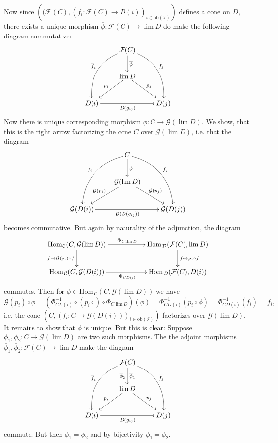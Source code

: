 \documentclass[11pt]{book}
\numberwithin{dummy}{section}
\theoremstyle{nonumberbreak}
\newenvironment{sol}[1][]{\ifthenelse{\equal{#1}{}}{\solution}{\solution[#1]}\rm}{\endsolution}
\newenvironment{prob}[1][]{\ifthenelse{\equal{#1}{}}{\problem}{\problem[#1]}\rm}{\endproblem}
\newcommand{\Hom}{\mathrm{Hom}\hspace{1pt}}
\newcommand{\C}{\mathcal{C}}
\newcommand{\D}{\mathcal{D}}
\newcommand{\F}{\mathcal{F}}
\newcommand{\G}{\mathcal{G}}
\newcommand{\I}{\mathcal{I}}
\newcommand{\la}{\longrightarrow}
\begin{document}
\begin{spacing}{1.4}
\begin{prob}
\begin{sol}
\begin{compactenum}
\item Now since $\left( (\F(C),(\overline{f}_i: \F(C) \la D(i))_{i \in \mathrm{ob}(\I)}\right)$ defines a cone on $D$, there exists a unique morphism $\overline{\phi}: \F(C) \la \lim D$ do make the following diagram commutative:
$$
\begin{xy}
\xymatrix{
& \F(C) \ar@/^{20pt}/[rdd]^{\overline{f_j}} \ar@/_{20pt}/[ldd]_{\overline{f}_i} \ar[d]^{\overline{\phi}} & \\ & \lim D \ar[rd]^{p_j} \ar[ld]_{p_i} & \\ D(i) \ar[rr]_{D(g_{ij})} && D(j) 
}
\end{xy}
$$
Now there is unique corresponding morphism $\phi: C \la \G( \lim D)$. We show, that this is the right arrow factorizing the cone $C$ over $\G(\lim D)$, i.e. that the diagram
$$
\begin{xy}
\xymatrix{
& C \ar[d]^{\phi} \ar@/^{20pt}/[rdd]^{f_j} \ar@/_{20pt}/[ldd]_{f_i} & \\ &  \G(\lim D) \ar[rd]^{\G(p_j)} \ar[ld]_{\G(p_i)} & \\ \G(D(i)) \ar[rr]_{\G(D(g_{ij}))} && \G(D(j))
}
\end{xy}
$$
becomes commutative. But again by naturality of the adjunction, the diagram
$$
\begin{xy}
\xymatrix{
\Hom_{\C}(C, \G(\lim D)) \ar[rr]^{\Phi_{C\lim D}} \ar[d]_{f \mapsto \G(p_i) \circ f} && \Hom_{\D}(\F(C), \lim D) \ar[d]^{f \mapsto p_i \circ f} \\ \Hom_{\C}(C, \G(D(i))) \ar[rr]_{\Phi_{CD(i)}} && \Hom_{\D}(\F(C), D(i))
}
\end{xy}
$$
commutes. Then for $\phi \in \Hom_{\C}(C, \G(\lim D))$ we have 
$$\G(p_i) \circ \phi = \left( \Phi_{CD(i)}^{-1} \circ (p_i \circ ) \circ \Phi_{C \lim D} \right) (\phi) = \Phi_{CD(i)}^{-1}(p_i \circ \overline{\phi}) = \Phi_{CD(i)}^{-1}(\overline{f}_i) = f_i,$$
i.e. the cone $\left(C, (f_i:C \la \G(D(i)))_{i \in \mathrm{ob}(\I)}\right)$ factorizes over $\G (\lim D)$. It remains to show that $\phi$ is unique. But this is clear: Suppose $\phi_1, \phi_2: C \la \G (\lim D)$ are two such morphisms. The the adjoint morphisms $\overline{\phi}_1, \overline{\phi}_2: \F(C) \la \lim D$ make the diagram
$$
\begin{xy}
\xymatrix{
& \F(C) \ar@/^{20pt}/[rdd]^{\overline{f_j}} \ar@/_{20pt}/[ldd]_{\overline{f}_i} \ar[d]^{\overline{\phi}_1} _{\overline{\phi}_2}& \\ & \lim D \ar[rd]^{p_j} \ar[ld]_{p_i} & \\ D(i) \ar[rr]_{D(g_{ij})} && D(j) 
}
\end{xy}
$$
commute. But then $\phi_1 = \phi_2$ and by bijectivity $\phi_1 = \phi_2$. 



\end{compactenum}
\end{sol}
\end{prob}
\end{spacing}
\end{document}
